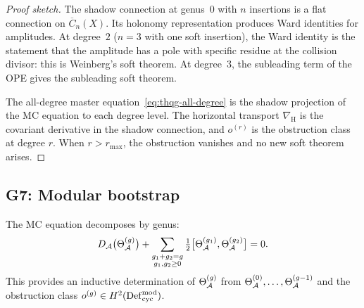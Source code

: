 \begin{proof}[Proof sketch]
The shadow connection at genus~$0$ with $n$ insertions is a
flat connection on $\overline{C}_n(X)$. Its holonomy
representation produces Ward identities for amplitudes. At
degree~$2$ ($n=3$ with one soft insertion), the Ward identity is
the statement that the amplitude has a pole with specific residue
at the collision divisor: this is Weinberg's soft theorem. At
degree~$3$, the subleading term of the OPE gives the subleading
soft theorem.

The all-degree master equation~\eqref{eq:thqg-all-degree} is the
shadow projection of the MC equation to each degree level. The
horizontal transport $\nabla_{\mathrm{H}}$ is the covariant
derivative in the shadow connection, and $o^{(r)}$ is the
obstruction class at degree $r$. When $r > r_{\max}$, the
obstruction vanishes and no new soft theorem arises.
\end{proof}


\subsection{G7: Modular bootstrap}

\begin{theorem}
The MC equation decomposes by genus:
\begin{equation}%
D_\cA\bigl(\Theta_\cA^{(g)}\bigr) +
\sum_{\substack{g_1 + g_2 = g \\ g_1, g_2 \ge 0}}
\tfrac{1}{2}\bigl[\Theta_\cA^{(g_1)}, \Theta_\cA^{(g_2)}\bigr] = 0.
\end{equation}
This provides an inductive determination of $\Theta_{\mathcal{A}}^{(g)}$ from
$\Theta_{\mathcal{A}}^{(0)}, \ldots, \Theta_{\mathcal{A}}^{(g-1)}$ and the obstruction class
$o^{(g)} \in H^2(\mathrm{Def}_{\mathrm{cyc}}^{\mathrm{mod}})$.
\end{theorem}

